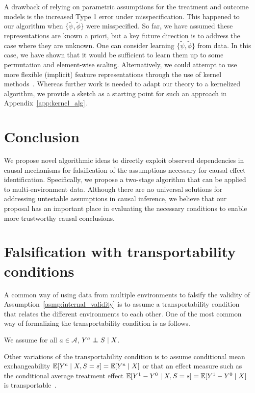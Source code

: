 \documentclass{article}
\begin{document}
A drawback of relying on parametric assumptions for the treatment and outcome models is the increased Type 1 error under misspecification. This happened to our algorithm when $\{\tilde\psi, \tilde\phi\}$ were misspecified. So far, we have assumed these representations are known a priori, but a key future direction is to address the case where they are unknown. One can consider learning $\{\tilde\psi, \tilde\phi\}$ from data. In this case, we have shown that it would be sufficient to learn them up to some permutation and element-wise scaling. Alternatively, we could attempt to use more flexible (implicit) feature representations through the use of kernel methods~\citep{scholkopf2002learning}. Whereas further work is needed to adapt our theory to a kernelized algorithm, we provide a sketch as a starting point for such an approach in Appendix~\ref{app:kernel_alg}.

\section{Conclusion}

We propose novel algorithmic ideas to directly exploit observed dependencies in causal mechanisms for falsification of the assumptions necessary for causal effect identification. Specifically, we propose a two-stage algorithm that can be applied to multi-environment data. Although there are no universal solutions for addressing untestable assumptions in causal inference, we believe that our proposal has an important place in evaluating the necessary conditions to enable more trustworthy causal conclusions.




\newpage
\appendix
\onecolumn


\section{Falsification with transportability conditions} \label{app:transportability}
A common way of using data from multiple environments to falsify the validity of Assumption~\ref*{asmp:internal_validity} is to assume a transportability condition that relates the different environments to each other. One of the most common way of formalizing the transportability condition is as follows.
\begin{assumption} \label{asmp:transportability} We assume for all $a\in\mathcal{A}$, $Y^a \indep S \mid X$.
\end{assumption}
Other variations of the transportability condition is to assume conditional mean exchangeability $\mathbb{E}[Y^a\mid X,S=s]=\mathbb{E}[Y^a\mid X]$ or that an effect measure such as the conditional average treatment effect $\mathbb{E}[Y^1-Y^0\mid X, S=s]=\mathbb{E}[Y^1-Y^0\mid X]$ is transportable~\citep{colnet2024causal}.
\end{document}
